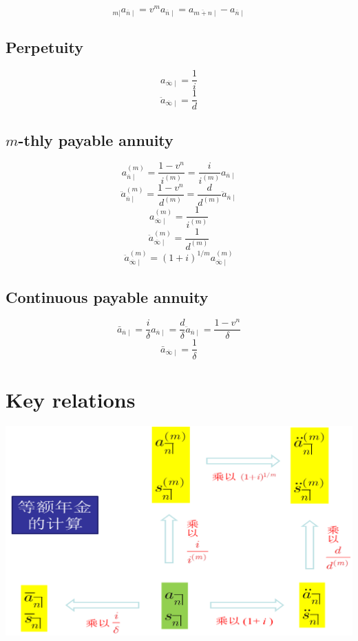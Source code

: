 \documentclass[
]{book}
\begin{document}
\[_{m|}a_{\overline{n}\mid}=v^ma_{\overline{n}\mid}=a_{\overline{m+n}\mid}-a_{\overline{n}\mid}\]

\hypertarget{perpetuity}{%
\subsection*{Perpetuity}\label{perpetuity}}

\[a_{\overline{\infty}\mid}=\frac{1}{i}\]
\[\ddot{a}_{\overline{\infty}\mid}=\frac{1}{d}\]

\hypertarget{m-thly-payable-annuity}{%
\subsection*{\texorpdfstring{\(m\)-thly payable annuity}{m-thly payable annuity}}\label{m-thly-payable-annuity}}

\[a^{(m)}_{\overline{n}\mid}=\frac{1-v^n}{i^{(m)}}=\frac{i}{i^{(m)}}a_{\overline{n}\mid}\]
\[\ddot{a}^{(m)}_{\overline{n}\mid}=\frac{1-v^n}{d^{(m)}}=\frac{d}{d^{(m)}}{\ddot{a}}_{\overline{n}\mid}\]
\[a^{(m)}_{\overline{\infty}\mid}=\frac{1}{i^{(m)}}\]
\[\ddot{a}^{(m)}_{\overline{\infty}\mid}=\frac{1}{d^{(m)}}\]
\[\ddot{a}^{(m)}_{\overline{\infty}\mid}=(1+i)^{1/m}a^{(m)}_{\overline{\infty}\mid}\]

\hypertarget{continuous-payable-annuity}{%
\subsection*{Continuous payable annuity}\label{continuous-payable-annuity}}

\[\bar{a}_{\overline{n}\mid}=\frac{i}{\delta}{a}_{\overline{n}\mid}=\frac{d}{\delta}\ddot{a}_{\overline{n}\mid}=\frac{1-v^n}{\delta}\]
\[\bar{a}_{\overline{\infty}\mid}=\frac{1}{\delta}\]

\hypertarget{key-relations}{%
\section{Key relations}\label{key-relations}}

\begin{center}\includegraphics[width=0.5\linewidth]{./plots/annuity-1} \end{center}
\end{document}

